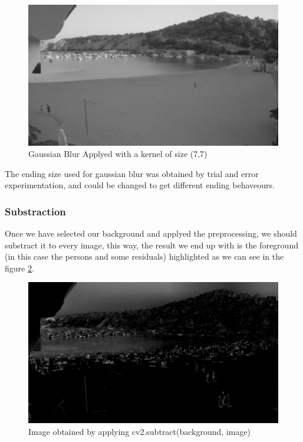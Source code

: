 \documentclass[10pt]{article}
\begin{document}
\begin{figure}[]
    \centering
    \includegraphics[width=\textwidth]{img/back_blur.png}
    \caption{Gaussian Blur Applyed with a kernel of size (7,7)}
    \label{fig:gaussian}
\end{figure}



The ending size used for gaussian blur was obtained by trial and error experimentation, and could be changed to get different ending behaveours.


\subsubsection*{Substraction}

Once we have selected our background and applyed the preprocessing, we should substract it to every image, this way, the result we end up with is the foreground (in this case the persons and some residuals) highlighted as we can see in the figure \ref{fig:sub}. 

\begin{figure}
    \centering
    \includegraphics[width=\textwidth]{img/sub.jpg}
    \caption{Image obtained by applying cv2.subtract(background, image)}
    \label{fig:sub}
\end{figure}
\end{document}
